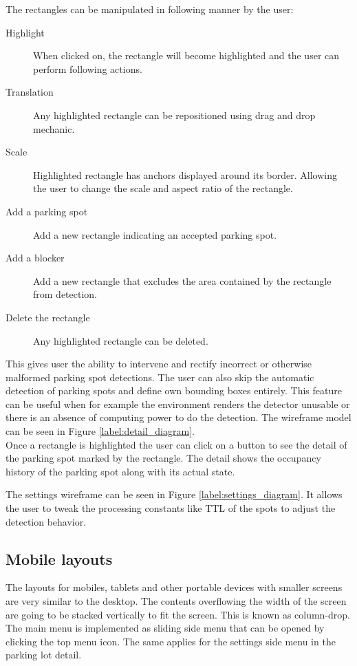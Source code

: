 \documentclass[thesis=M,english]{FITthesis}[2019/03/06]
\begin{document}
The rectangles can be manipulated in following manner by the user:

\begin{description}
    \item [Highlight] When clicked on, the rectangle will become highlighted and the user can perform following actions.
    \item [Translation] Any highlighted rectangle can be repositioned using drag and drop mechanic.
    \item [Scale] Highlighted rectangle has anchors displayed around its border. Allowing the user to change the scale and aspect ratio of the rectangle.
    \item [Add a parking spot] Add a new rectangle indicating an accepted parking spot.
    \item [Add a blocker] Add a new rectangle that excludes the area contained by the rectangle from detection.
    \item [Delete the rectangle] Any highlighted rectangle can be deleted.
\end{description}

This gives user the ability to intervene and rectify incorrect or otherwise malformed parking spot detections. The user can also skip the automatic detection of parking spots and define own bounding boxes entirely. This feature can be useful when for example the environment renders the detector unusable or there is an absence of computing power to do the detection. The wireframe model can be seen in Figure \ref{label:detail_diagram}.\\

Once a rectangle is highlighted the user can click on a button to see the detail of the parking spot marked by the rectangle. The detail shows the occupancy history of the parking spot along with its actual state.

The settings wireframe can be seen in Figure \ref{label:settings_diagram}. It allows the user to tweak the processing constants like TTL of the spots to adjust the detection behavior.


\subsection{Mobile layouts}
The layouts for mobiles, tablets and other portable devices with smaller screens are very similar to the desktop. The contents overflowing the width of the screen are going to be stacked vertically to fit the screen. This is known as column-drop. The main menu is implemented as sliding side menu that can be opened by clicking the top menu icon. The same applies for the settings side menu in the parking lot detail.\\
\end{document}
